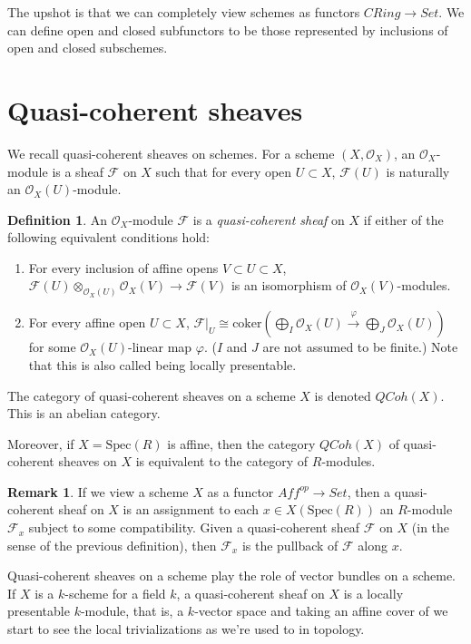 \documentclass[letterpaper,10pt,twoside]{amsart}
\theoremstyle{proposition}
\theoremstyle{definition}
\newtheorem{definition}[proposition]{Definition}
\theoremstyle{theorem}
\theoremstyle{definition}
\newtheorem{remark}[proposition]{\textbf{Remark}}
\theoremstyle{definition}
\theoremstyle{definition}
\theoremstyle{lemma}
\theoremstyle{definition}
\theoremstyle{definition}
\theoremstyle{corollary}
\theoremstyle{definition}
\def\Spec{\text{Spec}}
\def\O{\mathcal{O}}
\def\F{\mathcal{F}}
\begin{document}
The upshot is that we can completely view schemes as functors $CRing\to Set$. We can define open and closed subfunctors to be those represented by inclusions of open and closed subschemes. 

\section{Quasi-coherent sheaves}

We recall quasi-coherent sheaves on schemes. For a scheme $(X,\O_X)$, an $\O_X$-module is a sheaf $\F$ on $X$ such that for every open $U\subset X$, $\F(U)$ is naturally an $\O_X(U)$-module. 
\begin{definition}
    An $\O_X$-module $\F$ is a \textit{quasi-coherent sheaf} on $X$ if either of the following equivalent conditions hold:
    \begin{enumerate}
    \item For every inclusion of affine opens $V\subset U\subset X$, $\F(U)\otimes_{\O_X(U)}\O_X(V)\to \F(V)$ is an isomorphism of $\O_X(V)$-modules.
    \item For every affine open $U\subset X$, $\F|_U \cong \text{coker}(\bigoplus_I\O_X(U)\xrightarrow{\varphi} \bigoplus_J \O_X(U))$ for some $\O_X(U)$-linear map $\varphi$. ($I$ and $J$ are not assumed to be finite.) Note that this is also called being locally presentable.


    \end{enumerate}
\end{definition}

The category of quasi-coherent sheaves on a scheme $X$ is denoted $QCoh(X)$. This is an abelian category.

Moreover, if $X=\Spec(R)$ is affine, then the category $QCoh(X)$ of quasi-coherent sheaves on $X$ is equivalent to the category of $R$-modules.

\begin{remark}
    If we view a scheme $X$ as a functor $Aff^{op}\to Set$, then a quasi-coherent sheaf on $X$ is an assignment to each $x \in X(\Spec(R))$ an $R$-module $\F_x$ subject to some compatibility. Given a quasi-coherent sheaf $\F$ on $X$ (in the sense of the previous definition), then $\F_x$ is the pullback of $\F$ along $x$.
\end{remark}

Quasi-coherent sheaves on a scheme play the role of vector bundles on a scheme. If $X$ is a $k$-scheme for a field $k$, a quasi-coherent sheaf on $X$ is a locally presentable $k$-module, that is, a $k$-vector space and taking an affine cover of we start to see the local trivializations as we're used to in topology.
\end{document}
